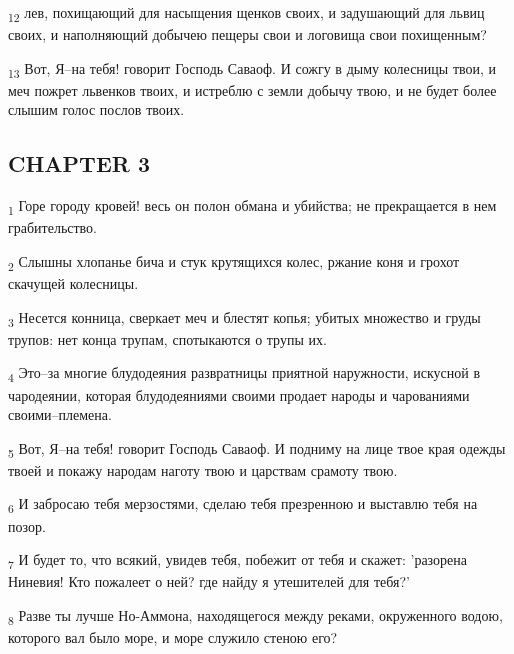 \begin{tcolorbox}
\textsubscript{12} лев, похищающий для насыщения щенков своих, и задушающий для львиц своих, и наполняющий добычею пещеры свои и логовища свои похищенным?
\end{tcolorbox}
\begin{tcolorbox}
\textsubscript{13} Вот, Я--на тебя! говорит Господь Саваоф. И сожгу в дыму колесницы твои, и меч пожрет львенков твоих, и истреблю с земли добычу твою, и не будет более слышим голос послов твоих.
\end{tcolorbox}
\subsection{CHAPTER 3}
\begin{tcolorbox}
\textsubscript{1} Горе городу кровей! весь он полон обмана и убийства; не прекращается в нем грабительство.
\end{tcolorbox}
\begin{tcolorbox}
\textsubscript{2} Слышны хлопанье бича и стук крутящихся колес, ржание коня и грохот скачущей колесницы.
\end{tcolorbox}
\begin{tcolorbox}
\textsubscript{3} Несется конница, сверкает меч и блестят копья; убитых множество и груды трупов: нет конца трупам, спотыкаются о трупы их.
\end{tcolorbox}
\begin{tcolorbox}
\textsubscript{4} Это--за многие блудодеяния развратницы приятной наружности, искусной в чародеянии, которая блудодеяниями своими продает народы и чарованиями своими--племена.
\end{tcolorbox}
\begin{tcolorbox}
\textsubscript{5} Вот, Я--на тебя! говорит Господь Саваоф. И подниму на лице твое края одежды твоей и покажу народам наготу твою и царствам срамоту твою.
\end{tcolorbox}
\begin{tcolorbox}
\textsubscript{6} И забросаю тебя мерзостями, сделаю тебя презренною и выставлю тебя на позор.
\end{tcolorbox}
\begin{tcolorbox}
\textsubscript{7} И будет то, что всякий, увидев тебя, побежит от тебя и скажет: 'разорена Ниневия! Кто пожалеет о ней? где найду я утешителей для тебя?'
\end{tcolorbox}
\begin{tcolorbox}
\textsubscript{8} Разве ты лучше Но-Аммона, находящегося между реками, окруженного водою, которого вал было море, и море служило стеною его?
\end{tcolorbox}
